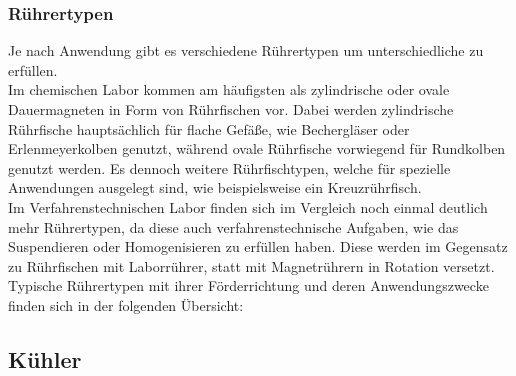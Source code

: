 \subsubsection*{Rührertypen}
Je nach Anwendung gibt es verschiedene Rührertypen um unterschiedliche zu erfüllen. \\
Im chemischen Labor kommen am häufigsten als zylindrische oder ovale Dauermagneten in Form von Rührfischen vor. Dabei werden zylindrische Rührfische hauptsächlich für flache Gefäße, wie Bechergläser oder Erlenmeyerkolben genutzt, während ovale Rührfische vorwiegend für Rundkolben genutzt werden. Es dennoch weitere Rührfischtypen, welche für spezielle Anwendungen ausgelegt sind, wie beispielsweise ein Kreuzrührfisch.\\
Im Verfahrenstechnischen Labor finden sich im Vergleich noch einmal deutlich mehr Rührertypen, da diese auch verfahrenstechnische Aufgaben, wie das Suspendieren oder Homogenisieren zu erfüllen haben.
Diese werden im Gegensatz zu Rührfischen mit Laborrührer, statt mit Magnetrührern in Rotation versetzt. Typische Rührertypen mit ihrer Förderrichtung und deren Anwendungszwecke finden sich in der folgenden Übersicht:
\begin{table}[h!]
	\renewcommand*{\arraystretch}{1.2}
	\centering
	\caption{Übersicht Rührertypen}
	\label{tab:ruehrertypen}
\end{table}%
\FloatBarrier

\subsection{Kühler}
